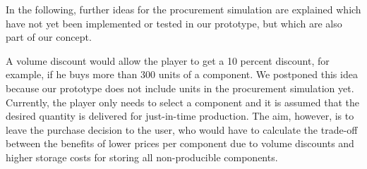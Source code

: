 In the following, further ideas for the procurement simulation are explained which have not yet been implemented or tested in our prototype, but which are also part of our concept.

A volume discount would allow the player to get a 10 percent discount, for example, if he buys more than 300 units of a component. We postponed this idea because our prototype does not include units in the procurement simulation yet. Currently, the player only needs to select a component and it is assumed that the desired quantity is delivered for just-in-time production. 
The aim, however, is to leave the purchase decision to the user, who would have to calculate the trade-off between the benefits of lower prices per component due to volume discounts and higher storage costs for storing all non-producible components.